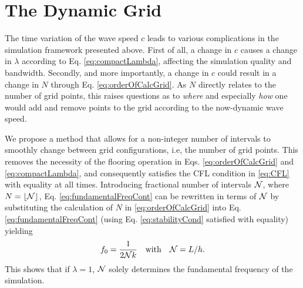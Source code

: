 \section{The Dynamic Grid}\label{sec:dynamicGrid}
The time variation of the wave speed $c$ leads to various complications in the simulation framework presented above. First of all, a change in $c$ causes a change in $\lambda$ according to Eq. \eqref{eq:compactLambda}, affecting the simulation quality and bandwidth. Secondly, and more importantly, a change in $c$ could result in a change in $N$ through Eq. \eqref{eq:orderOfCalcGrid}. As $N$ directly relates to the number of grid points, this raises questions as to \textit{where} and especially \textit{how} one would add and remove points to the grid according to the now-dynamic wave speed.

We propose a method that allows for a non-integer number of intervals to smoothly change between grid configurations, i.e, the number of grid points. This removes the necessity of the flooring operation in Eqs. \eqref{eq:orderOfCalcGrid} and \eqref{eq:compactLambda}, and consequently satisfies the CFL condition in \eqref{eq:CFL} with equality at all times. Introducing fractional number of intervals $\mathcal{N}$, where $N = \lfloor \mathcal{N}\rfloor$, Eq. \eqref{eq:fundamentalFreqCont} can be rewritten in terms of $\mathcal{N}$ by substituting the calculation of $N$ in \eqref{eq:orderOfCalcGrid} into Eq. \eqref{eq:fundamentalFreqCont} (using Eq. \eqref{eq:stabilityCond} satisfied with equality) yielding
\begin{equation}\label{eq:fundamentalFreq}
    f_0 = \frac{1}{2\mathcal{N} k}\quad \text{with}\quad \mathcal{N} = L/h.
\end{equation}
 
This shows that if $\lambda = 1$, $\mathcal{N}$ solely determines the fundamental frequency of the simulation. 


